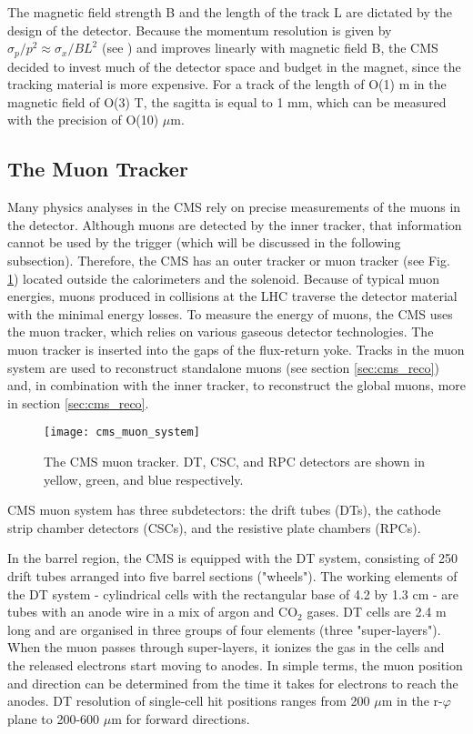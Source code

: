 \begin{normalsize}
The magnetic field strength B and the length of the track L are dictated by the design of the detector. Because the momentum resolution is given by $\sigma_p / p^2 \approx \sigma_x / B L^2 $ (see \cite {Hauptman:2011zza}) and improves linearly with magnetic field B, the CMS decided to invest much of the detector space and budget in the magnet, since the tracking material is more expensive. For a track of the length of O(1) m in the magnetic field of O(3) T, the sagitta is equal to 1 mm, which can be measured with the precision of O(10) $\mu$m.



\subsection{The Muon Tracker}

Many physics analyses in the CMS rely on precise measurements of the muons in the detector. Although muons are detected by the inner tracker, that information cannot be used by the trigger (which will be discussed in the following subsection). Therefore, the CMS has an outer tracker or muon tracker \cite{Muon_system_TDR} (see Fig. \ref{cms_muon_system}) located outside the calorimeters and the solenoid. Because of typical muon energies, muons produced in collisions at the LHC traverse the detector material with the minimal energy losses. To measure the energy of muons, the CMS uses the muon tracker, which relies on various gaseous detector technologies. The muon tracker is inserted into the gaps of the flux-return yoke. Tracks in the muon system are used to reconstruct standalone muons (see section \ref{sec:cms_reco}) and, in combination with the inner tracker, to reconstruct the global muons, more in section \ref{sec:cms_reco}.



 \begin{figure}[H]
  \centering
  \texttt{[image: cms\_muon\_system]}
  \caption[The CMS muon tracker]{The CMS muon tracker. DT, CSC, and RPC detectors are shown in yellow, green, and blue respectively.}
  \label{cms_muon_system}
\end{figure}

CMS muon system has three subdetectors: the drift tubes (DTs), the cathode strip chamber detectors (CSCs), and the resistive plate chambers (RPCs). 

In the barrel region, the CMS is equipped with the DT system, consisting of 250 drift tubes arranged into five barrel sections ("wheels"). The working elements of the DT system - cylindrical cells with the rectangular base of 4.2 by 1.3 cm - are tubes with an anode wire in a mix of argon and CO$_2$ gases. DT cells are 2.4 m long and are organised in three groups of four elements (three "super-layers"). When the muon passes through super-layers, it ionizes the gas in the cells and the released electrons start moving to anodes. In simple terms, the muon position and direction can be determined from the time it takes for electrons to reach the anodes. DT resolution of single-cell hit positions ranges from 200 $\mu$m in the r-$\varphi$ plane to 200-600 $\mu$m for forward directions. 


\end{normalsize}
